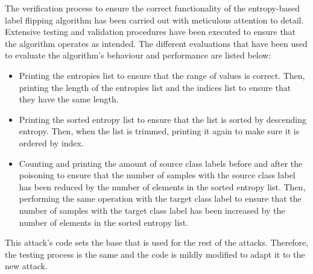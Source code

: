 
The verification process to ensure the correct functionality of the entropy-based label flipping algorithm has been carried out with meticulous attention to detail. Extensive testing and validation procedures have been executed to ensure that the algorithm operates as intended. The different evaluations that have been used to evaluate the algorithm's behaviour and performance are listed below:
\begin{itemize}
        \item Printing the entropies list to ensure that the range of values is correct. Then, printing the length of the entropies list and the indices list to ensure that they have the same length.
        \item Printing the sorted entropy list to ensure that the list is sorted by descending entropy. Then, when the list is trimmed, printing it again to make sure it is ordered by index.
        \item Counting and printing the amount of source class labels before and after the poisoning to ensure that the number of samples with the source class label has been reduced by the number of elements in the sorted entropy list. Then, performing the same operation with the target class label to ensure that the number of samples with the target class label has been increased by the number of elements in the sorted entropy list.
\end{itemize}

This attack's code sets the base that is used for the rest of the attacks. Therefore, the testing process is the same and the code is mildly modified to adapt it to the new attack.

